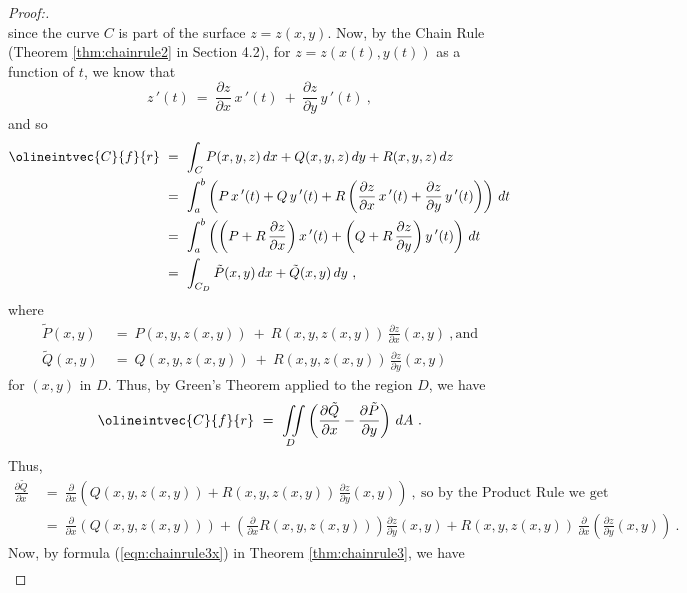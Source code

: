 \begin{proof}[Proof:]
\begin{displaymath}
 \end{displaymath}
 since the curve $C$ is part of the surface $z=z(x,y)$. Now, by the Chain Rule (Theorem \ref{thm:chainrule2} in
 Section 4.2), for $z=z(x(t),y(t))$ as a function of $t$, we know that
 \begin{displaymath}
  z\,'(t) ~=~ \frac{\partial z}{\partial x}\,x\,'(t) ~+~ \frac{\partial z}{\partial y}\,y\,'(t) ~,
 \end{displaymath}
 and so
 \begin{align*}
  \olineintvec{C}{f}{r} ~&=~ \int_C P(x,y,z)\,dx + Q(x,y,z)\,dy + R(x,y,z)\,dz\\
   &=~ \int_a^b \left( P\,x\,'(t) + Q\,y\,'(t) +
    R\left( \frac{\partial z}{\partial x}\,x\,'(t) + \frac{\partial z}{\partial y}\,y\,'(t)
    \right) \right)\,dt\\
   &=~ \int_a^b \left( \left( P+R\,\frac{\partial z}{\partial x} \right) x\,'(t) +
    \left( Q+R\,\frac{\partial z}{\partial y} \right) y\,'(t) \right)\,dt\\
   &=~ \int_{C_D} \tilde{P}(x,y)\,dx + \tilde{Q}(x,y)\,dy ~,
 \end{align*}
 where
 \begin{align*}
  \tilde{P}(x,y) ~&=~ P(x,y,z(x,y)) ~+~ R(x,y,z(x,y))\,\frac{\partial z}{\partial x}(x,y)~,\text{and}\\
  \tilde{Q}(x,y) ~&=~ Q(x,y,z(x,y)) ~+~ R(x,y,z(x,y))\,\frac{\partial z}{\partial y}(x,y)
 \end{align*}
 for $(x,y)$ in $D$. Thus, by Green's Theorem applied to the region $D$, we have
 \begin{equation}\label{eqn:stokesproof}
  \olineintvec{C}{f}{r} ~=~ \iint\limits_{D} \left( \frac{\partial \tilde{Q}}{\partial x} -
   \frac{\partial \tilde{P}}{\partial y} \right)\,dA ~.
 \end{equation}
 Thus,
 \begin{align*}
  \frac{\partial \tilde{Q}}{\partial x} ~&=~ \frac{\partial}{\partial x} \left( Q(x,y,z(x,y)) +
   R(x,y,z(x,y))\,\frac{\partial z}{\partial y}(x,y) \right) ~,~\text{so by the Product Rule we get}\\
   &=~ \frac{\partial}{\partial x} \left( Q(x,y,z(x,y)) \right) + \left( \frac{\partial}{\partial x} R(x,y,z(x,y))
   \right) \frac{\partial z}{\partial y}(x,y) + R(x,y,z(x,y))\,\frac{\partial}{\partial x} \left(
   \frac{\partial z}{\partial y}(x,y) \right) ~.
 \end{align*}
 Now, by formula (\ref{eqn:chainrule3x}) in Theorem \ref{thm:chainrule3}, we have
 \begin{align*}

\end{align*}
\end{proof}
